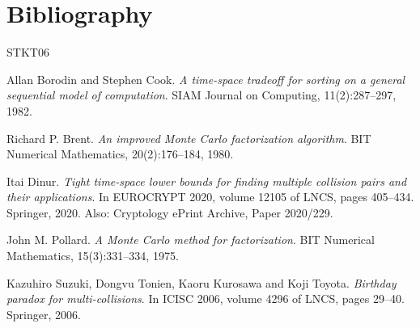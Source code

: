 \documentclass{conjura-conjecture}
\begin{document}
\section{Bibliography}

\begin{conjurabibliography}{STKT06}

Allan Borodin and Stephen Cook.
\emph{A time-space tradeoff for sorting on a general sequential model of computation}.
SIAM Journal on Computing, 11(2):287--297, 1982.

Richard P. Brent.
\emph{An improved Monte Carlo factorization algorithm}.
BIT Numerical Mathematics, 20(2):176--184, 1980.

Itai Dinur.
\emph{Tight time-space lower bounds for finding multiple collision pairs and their
applications}.
In EUROCRYPT 2020, volume 12105 of LNCS, pages 405--434. Springer, 2020.
Also: Cryptology ePrint Archive, Paper 2020/229.

John M. Pollard.
\emph{A Monte Carlo method for factorization}.
BIT Numerical Mathematics, 15(3):331--334, 1975.

Kazuhiro Suzuki, Dongvu Tonien, Kaoru Kurosawa and Koji Toyota.
\emph{Birthday paradox for multi-collisions}.
In ICISC 2006, volume 4296 of LNCS, pages 29--40. Springer, 2006.

\end{conjurabibliography}
\end{document}
